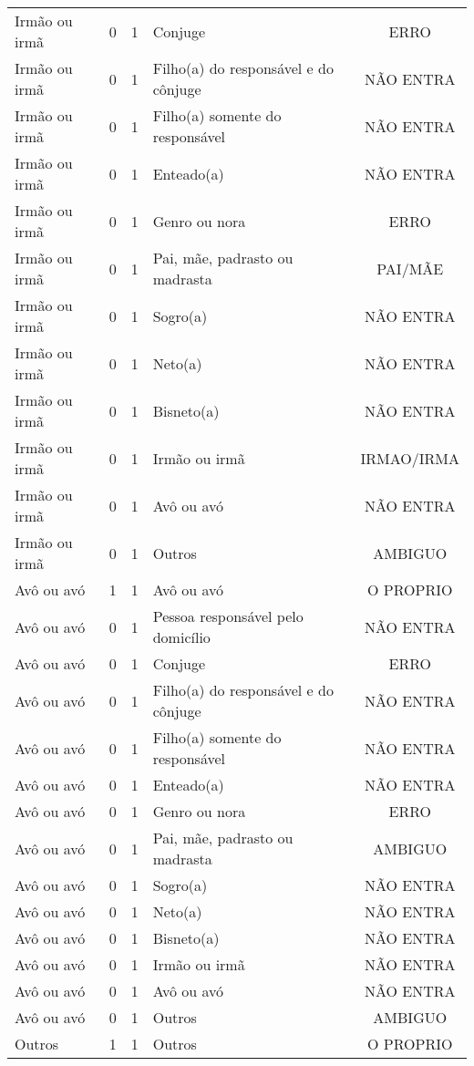 \documentclass[
	12pt,				%
	openright,			%
	twoside,			%
	a4paper,			%
	english,			%
	french,				%
	spanish,			%
	brazil				%
	]{abntex2}
\begin{document}
\begin{anexosenv}
\begin{longtable}{@{}lcclc@{}}
				Irmão ou irmã & 0 & 1 & Conjuge & ERRO \\
				Irmão ou irmã & 0 & 1 & Filho(a) do responsável e do cônjuge & NÃO ENTRA \\
				Irmão ou irmã & 0 & 1 & Filho(a) somente do responsável & NÃO ENTRA \\
				Irmão ou irmã & 0 & 1 & Enteado(a) & NÃO ENTRA \\
				Irmão ou irmã & 0 & 1 & Genro ou nora & ERRO \\
				Irmão ou irmã & 0 & 1 & Pai, mãe, padrasto ou madrasta & PAI/MÃE \\
				Irmão ou irmã & 0 & 1 & Sogro(a) & NÃO ENTRA \\
				Irmão ou irmã & 0 & 1 & Neto(a) & NÃO ENTRA \\
				Irmão ou irmã & 0 & 1 & Bisneto(a) & NÃO ENTRA \\
				Irmão ou irmã & 0 & 1 & Irmão ou irmã & IRMAO/IRMA \\
				Irmão ou irmã & 0 & 1 & Avô ou avó & NÃO ENTRA \\
				Irmão ou irmã & 0 & 1 & Outros & AMBIGUO \\
				Avô ou avó & 1 & 1 & Avô ou avó & O PROPRIO \\
				Avô ou avó & 0 & 1 & Pessoa responsável pelo domicílio & NÃO ENTRA \\
				Avô ou avó & 0 & 1 & Conjuge & ERRO \\
				Avô ou avó & 0 & 1 & Filho(a) do responsável e do cônjuge & NÃO ENTRA \\
				Avô ou avó & 0 & 1 & Filho(a) somente do responsável & NÃO ENTRA \\
				Avô ou avó & 0 & 1 & Enteado(a) & NÃO ENTRA \\
				Avô ou avó & 0 & 1 & Genro ou nora & ERRO \\
				Avô ou avó & 0 & 1 & Pai, mãe, padrasto ou madrasta & AMBIGUO \\
				Avô ou avó & 0 & 1 & Sogro(a) & NÃO ENTRA \\
				Avô ou avó & 0 & 1 & Neto(a) & NÃO ENTRA \\
				Avô ou avó & 0 & 1 & Bisneto(a) & NÃO ENTRA \\
				Avô ou avó & 0 & 1 & Irmão ou irmã & NÃO ENTRA \\
				Avô ou avó & 0 & 1 & Avô ou avó & NÃO ENTRA \\
				Avô ou avó & 0 & 1 & Outros & AMBIGUO \\
				Outros & 1 & 1 & Outros & O PROPRIO \\

\end{longtable}
\end{anexosenv}
\end{document}
